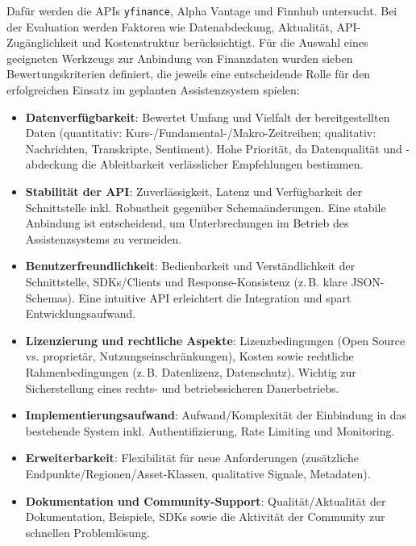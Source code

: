    Dafür werden die \acs{API}s \texttt{yfinance}, Alpha Vantage und Finnhub untersucht.
    Bei der Evaluation werden Faktoren wie Datenabdeckung, Aktualität, \acs{API}-Zugänglichkeit und Kostenstruktur berücksichtigt.
    Für die Auswahl eines geeigneten Werkzeugs zur Anbindung von Finanzdaten wurden sieben Bewertungskriterien definiert, die jeweils eine entscheidende Rolle für den erfolgreichen Einsatz im geplanten Assistenzsystem spielen:

    \begin{itemize}
      \item \textbf{Datenverfügbarkeit}: Bewertet Umfang und Vielfalt der bereitgestellten Daten (quantitativ: Kurs-/Fundamental-/Makro-Zeitreihen; qualitativ: Nachrichten, Transkripte, Sentiment).
      Hohe Priorität, da Datenqualität und -abdeckung die Ableitbarkeit verlässlicher Empfehlungen bestimmen.

      \item \textbf{Stabilität der \acs{API}}: Zuverlässigkeit, Latenz und Verfügbarkeit der Schnittstelle inkl. Robustheit gegenüber Schemaänderungen.
      Eine stabile Anbindung ist entscheidend, um Unterbrechungen im Betrieb des Assistenzsystems zu vermeiden.

      \item \textbf{Benutzerfreundlichkeit}: Bedienbarkeit und Verständlichkeit der Schnittstelle, SDKs/Clients und Response-Konsistenz (z.\,B. klare JSON-Schemas).
      Eine intuitive \acs{API} erleichtert die Integration und spart Entwicklungsaufwand.

      \item \textbf{Lizenzierung und rechtliche Aspekte}: Lizenzbedingungen (Open Source vs. proprietär, Nutzungseinschränkungen), Kosten sowie rechtliche Rahmenbedingungen (z.\,B. Datenlizenz, Datenschutz). Wichtig zur Sicherstellung eines rechts- und betriebssicheren Dauerbetriebs.

      \item \textbf{Implementierungsaufwand}: Aufwand/Komplexität der Einbindung in das bestehende System inkl. Authentifizierung, Rate Limiting und Monitoring.

      \item \textbf{Erweiterbarkeit}: Flexibilität für neue Anforderungen (zusätzliche Endpunkte/Regionen/Asset-Klassen, qualitative Signale, Metadaten).

      \item \textbf{Dokumentation und Community-Support}: Qualität/Aktualität der Dokumentation, Beispiele, SDKs sowie die Aktivität der Community zur schnellen Problemlösung.
    \end{itemize}

